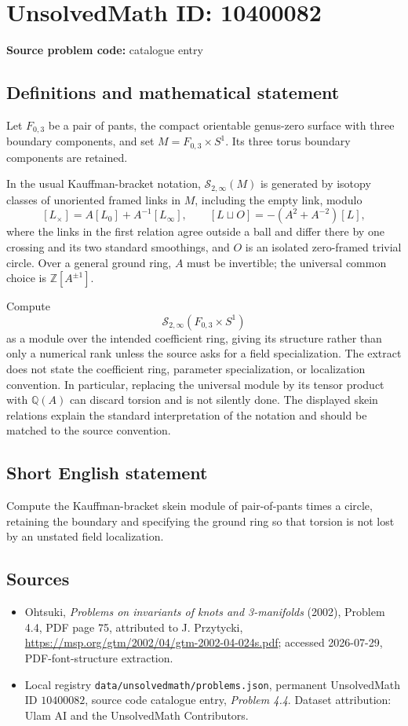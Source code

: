 \documentclass[11pt]{article}
\begin{document}
\section*{UnsolvedMath ID: 10400082}
\textbf{Source problem code:} catalogue entry
\subsection{Definitions and mathematical statement}
Let $F_{0,3}$ be a pair of pants, the compact orientable genus-zero surface with three boundary components, and set $M=F_{0,3}\times S^1$. Its three torus boundary components are retained.

In the usual Kauffman-bracket notation, $\mathcal S_{2,\infty}(M)$ is generated by isotopy classes of unoriented framed links in $M$, including the empty link, modulo
\[
[L_\times]=A[L_0]+A^{-1}[L_\infty],\qquad
[L\sqcup O]=-(A^2+A^{-2})[L],
\]
where the links in the first relation agree outside a ball and differ there by one crossing and its two standard smoothings, and $O$ is an isolated zero-framed trivial circle. Over a general ground ring, $A$ must be invertible; the universal common choice is $\mathbb Z[A^{\pm1}]$.

Compute
\[
\mathcal S_{2,\infty}(F_{0,3}\times S^1)
\]
as a module over the intended coefficient ring, giving its structure rather than only a numerical rank unless the source asks for a field specialization. The extract does not state the coefficient ring, parameter specialization, or localization convention. In particular, replacing the universal module by its tensor product with $\mathbb Q(A)$ can discard torsion and is not silently done. The displayed skein relations explain the standard interpretation of the notation and should be matched to the source convention.
\subsection{Short English statement}
Compute the Kauffman-bracket skein module of pair-of-pants times a circle, retaining the boundary and specifying the ground ring so that torsion is not lost by an unstated field localization.
\subsection{Sources}
\begin{itemize}
\item Ohtsuki, \emph{Problems on invariants of knots and 3-manifolds} (2002), Problem 4.4, PDF page 75, attributed to J. Przytycki, \url{https://msp.org/gtm/2002/04/gtm-2002-04-024s.pdf}; accessed 2026-07-29, PDF-font-structure extraction.
\item Local registry \texttt{data/unsolvedmath/problems.json}, permanent UnsolvedMath ID $10400082$, source code catalogue entry, \emph{Problem 4.4}. Dataset attribution: Ulam AI and the UnsolvedMath Contributors.
\end{itemize}
\end{document}
